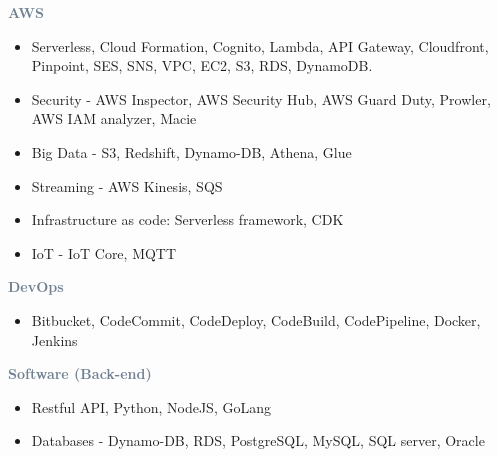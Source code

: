 



\divider




\textcolor{SlateGrey}{\textbf{AWS}}
\newline

\begin{itemize}
    \item Serverless, Cloud Formation, Cognito, Lambda, API Gateway, Cloudfront, Pinpoint, SES, SNS, VPC, EC2, S3, RDS, DynamoDB.
    \item Security - AWS Inspector, AWS Security Hub, AWS Guard Duty, Prowler, AWS IAM analyzer, Macie 
    \item Big Data - S3, Redshift, Dynamo-DB, Athena, Glue 
    \item Streaming - AWS Kinesis, SQS
    \item Infrastructure as code: Serverless framework, CDK
    \item IoT - IoT Core, MQTT
    \end{itemize}

\textcolor{SlateGrey}{\textbf{DevOps}}
\newline

\begin{itemize}
    \item Bitbucket, CodeCommit, CodeDeploy, CodeBuild, CodePipeline, Docker, Jenkins
\end{itemize}

\textcolor{SlateGrey}{\textbf{Software (Back-end)}}
\newline

\begin{itemize}
    \item Restful API, Python, NodeJS, GoLang
    \item Databases - Dynamo-DB, RDS, PostgreSQL, MySQL, SQL server, Oracle
\end{itemize}


